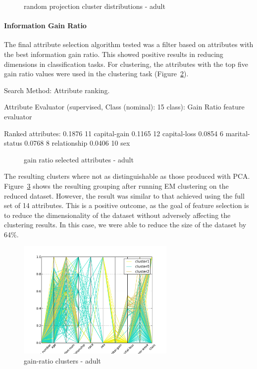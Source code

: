 \documentclass{sig-alternate}
\begin{document}
\begin{figure}[!htbp]
    \centering
    \theverbbox
    \caption{random projection cluster distributions - adult\label{rp-custer-dist-adult}}
\end{figure}


\paragraph{Information Gain Ratio}

The final attribute selection algorithm tested was a filter based on attributes with the best information gain ratio. This showed positive results in reducing dimensions in classification tasks. For clustering, the attributes with the top five gain ratio values were used in the clustering task (Figure~\ref{gain-adult}).

\scriptsize
\begin{verbbox}
Search Method:
    Attribute ranking.

Attribute Evaluator (supervised, Class (nominal): 15 class):
    Gain Ratio feature evaluator

Ranked attributes:
 0.1876  11 capital-gain
 0.1165  12 capital-loss
 0.0854   6 marital-status
 0.0768   8 relationship
 0.0406  10 sex
\end{verbbox}
\normalsize

\begin{figure}[!htbp]
    \centering
    \theverbbox
    \caption{gain ratio selected attributes - adult\label{gain-adult}}
\end{figure}


The resulting clusters where not as distinguishable as those produced with PCA. Figure~\ref{parallel-gain-cluster} shows the resulting grouping after running EM clustering on the reduced dataset. However, the result was similar to that achieved using the full set of 14 attributes. This is a positive outcome, as the goal of feature selection is to reduce the dimensionality of the dataset without adversely affecting the clustering results. In this case, we were able to reduce the size of the dataset by 64\%.

\begin{figure}[!htbp]
    \centering
    \includegraphics[width=3in]{part2/adult/parallel-gain-cluster.pdf}
    \caption{gain-ratio clusters - adult\label{parallel-gain-cluster}}
\end{figure} 
\end{document}
